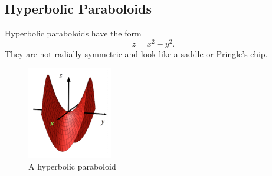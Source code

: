 \subsection{Hyperbolic Paraboloids}
\noindent
Hyperbolic paraboloids have the form
\begin{equation*}
	z = x^2 - y^2.
\end{equation*} 
They are not radially symmetric and look like a saddle or Pringle's chip.

\begin{figure}[H]
	\centering
	\includegraphics[width=0.33\textwidth]{./differentialMultivariableCalculus/hyperbolic_paraboloid.png}
	\caption{A hyperbolic paraboloid}
\end{figure}